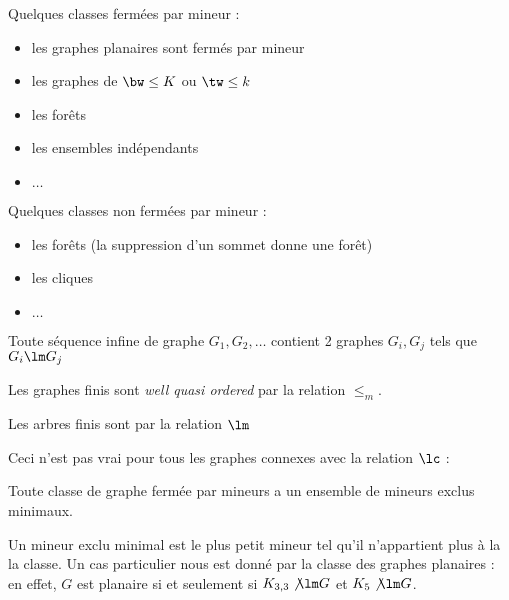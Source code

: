 \documentclass[a4paper, 11pt]{thesis}
\begin{document}
Quelques classes fermées par mineur :
\begin{itemize}
    \item les graphes planaires sont fermés par mineur
    \item les graphes de $\bw \leq K$ ou $\tw \leq k$
    \item les forêts
    \item les ensembles indépendants 
    \item $\dots$
\end{itemize}

Quelques classes non fermées par mineur :
\begin{itemize}
    \item les forêts (la suppression d'un sommet donne une forêt)
    \item les cliques
    \item $\dots$
\end{itemize}

\begin{df}
    Toute séquence infine de graphe $G_1, G_2, \dots$ contient 2 graphes $G_i, G_j$ tels que $G_i
    \lm G_j$
\end{df}

\begin{thrm}
    Les graphes finis sont \emph{well quasi ordered} par la relation $\leq_m$.
\end{thrm}

\begin{thrm}[Kruskal, 1960]
    Les arbres finis sont \wqo par la relation $\lm$
\end{thrm}

Ceci n'est pas vrai pour tous les graphes connexes avec la relation $\lc$ :

\begin{corol}
    Toute classe de graphe fermée par mineurs a un ensemble  de mineurs exclus minimaux.
\end{corol}

Un mineur exclu minimal est le plus petit mineur tel qu'il n'appartient plus à la la classe.
Un cas particulier nous est donné par la classe des graphes planaires : en effet, $G$ est planaire
si et seulement si $K_{3,3} \not \lm G$ et $K_5 \not \lm G$.
\end{document}
